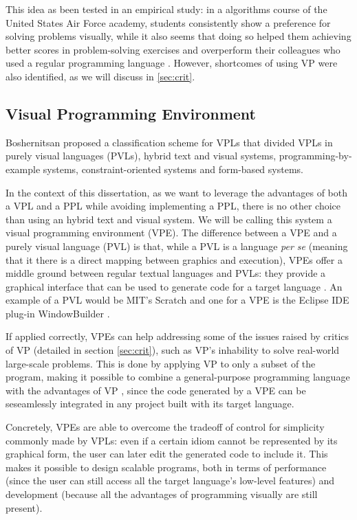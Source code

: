 \begin{itemsize}
This idea as been tested in an empirical study:
in a algorithms course of the United States Air Force academy,
students consistently show a preference for solving problems visually,
while it also seems that doing so helped them achieving better
scores in problem-solving exercises and overperform their colleagues who used
a regular programming language \cite{Cardellini2002}. However, shortcomes of
using VP were also identified, as we will discuss in \ref{sec:crit}.

\subsection{Visual Programming Environment}
\label{sec:vpe}

Boshernitsan proposed a classification scheme for VPLs \cite{Boshernitsan2004}
that divided VPLs in purely visual languages (PVLs), hybrid text and visual systems,
programming-by-example systems, constraint-oriented systems and form-based systems.

In the context of this dissertation, as we want to leverage the advantages of
both a VPL and a PPL while avoiding implementing a PPL, there is no other choice
than using an hybrid text and visual system. We will be calling this system a
visual programming environment (VPE). The difference between a VPE and a purely visual language (PVL)
is that, while a PVL is a language \textit{per se} (meaning that it there
is a direct mapping between graphics and execution), VPEs offer a middle ground
between regular textual languages and PVLs: they provide a graphical interface
that can be used to generate code for a target language \cite{Burnett1999}.
An example of a PVL would be MIT's Scratch \cite{resnick2009scratch} and one for
a VPE is the Eclipse IDE plug-in WindowBuilder \cite{winbuild}.

If applied
correctly, VPEs can help addressing some of the issues raised by critics of VP (detailed in section \ref{sec:crit}),
such as VP's inhability to solve real-world large-scale problems. This is done
by applying VP to only a subset of the program, making it possible to combine
a general-purpose programming language with the advantages of VP \cite{Burnett1999},
since the code generated by a VPE can be seseamlessly integrated in any project
built with its target language.

Concretely, VPEs are able to overcome the tradeoff of control for simplicity
commonly made by VPLs: even if a certain idiom cannot be represented by its
graphical form, the user can later edit the generated code to include it. This
makes it possible to design scalable programs, both in terms of performance
(since the user can still access all the target language's low-level features) and development
(because all the advantages of programming visually are still present).


\end{itemsize}
